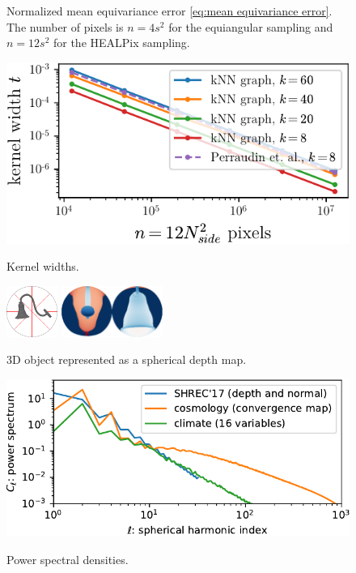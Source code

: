 \documentclass{article} %
\begin{document}
\begin{figure}
\begin{minipage}{0.6\linewidth}
		\caption{Normalized mean equivariance error \eqref{eq:mean equivariance error}. The number of pixels is $n = 4 s^2$ for the equiangular sampling and $n = 12 s^2$ for the HEALPix sampling.}
		\label{fig:equivariance_error}
	\end{minipage}
	\hfill
	\begin{minipage}{0.35\linewidth}
		\centering
		\includegraphics[width=\linewidth]{kernel_widths}
		\caption{Kernel widths.}
		\label{fig:kernel_widths}
		\vspace{1em}
		\includegraphics[height=4.5em]{lamp_000018}
		\hfill
		\includegraphics[height=4.5em]{lamp_000018_sphere_nobar}
		\caption{3D object represented as a spherical depth map.}
		\label{fig:depthmap}
		\vspace{1em}
		\includegraphics[width=\linewidth]{spectrum}
		\caption{Power spectral densities.}
		\label{fig:spectrum}
	\end{minipage}
\end{figure}
\end{document}

